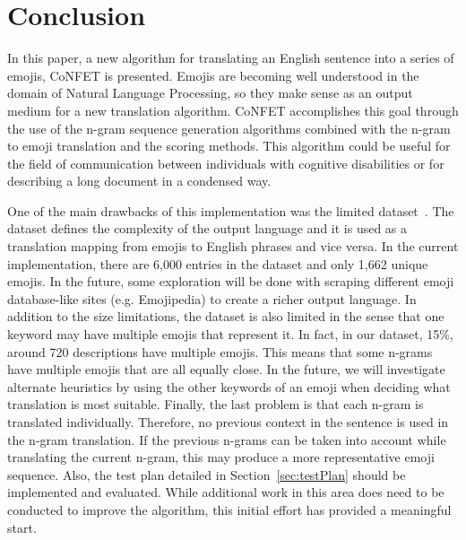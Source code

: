 \documentclass{article}[10]
\begin{document}
\section{Conclusion}

In this paper, a new algorithm for translating an English sentence into a series
of emojis, CoNFET is presented. Emojis are becoming well understood in the
domain of Natural Language Processing, so they make sense as an output medium
for a new translation algorithm. CoNFET accomplishes this goal through the use
of the n-gram sequence generation algorithms combined with the n-gram to emoji
translation and the scoring methods. This algorithm could be useful for the
field of communication between individuals with cognitive disabilities or for
describing a long document in a condensed way.

One of the main drawbacks of this implementation was the limited
dataset~\cite{Eisner_2016}. The dataset defines the complexity of the output
language and it is used as a translation mapping from emojis to English phrases
and vice versa. In the current implementation, there are 6,000
entries in the dataset and only 1,662 unique emojis. In the future, some exploration will be done with scraping
different emoji database-like sites (e.g. Emojipedia) to create a richer output
language. In addition to the size limitations, the dataset is also limited in
the sense that one keyword may have multiple emojis that represent it. In fact,
in our dataset, 15\%, around 720 descriptions have multiple emojis. This means
that some n-grams have multiple emojis that are all equally close. In the
future, we will investigate alternate heuristics by using the other keywords of
an emoji when deciding what translation is most suitable. Finally, the last
problem is that each n-gram is translated individually. Therefore, no previous
context in the sentence is used in the n-gram translation. If the previous
n-grams can be taken into account while translating the current n-gram, this may
produce a more representative emoji sequence. Also, the test plan detailed in
Section~\ref{sec:testPlan} should be implemented and evaluated. While additional
work in this area does need to be conducted to improve the algorithm, this
initial effort has provided a meaningful start.

\makeatother  
\end{document}
